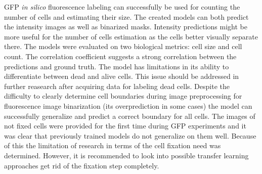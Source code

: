 GFP \textit{in silico} fluorescence labeling can successfully be used for counting the number of cells and estimating their size. The created models can both predict the intensity images as well as binarized masks. Intensity predictions might be more useful for the number of cells estimation as the cells better visually separate there. The models were evaluated on two biological metrics: cell size and cell count. The correlation coefficient suggests a strong correlation between the predictions and ground truth. The model has limitations in its ability to differentiate between dead and alive cells. This issue should be addressed in further reasearch after acquiring data for labeling dead cells. Despite the difficulty to clearly determine cell boundaries during image preprocessing for fluorescence image binarization (its overprediction in some cases) the model can successfully generalize and predict a correct boundary for all cells. The images of not fixed cells were provided for the first time during GFP experiments and it was clear that previously trained models do not generalize on them well.  Because of this the limitation of research in terms of the cell fixation need was determined. However, it is recommended to look into possible transfer learning approaches get rid of the fixation step completely.
  